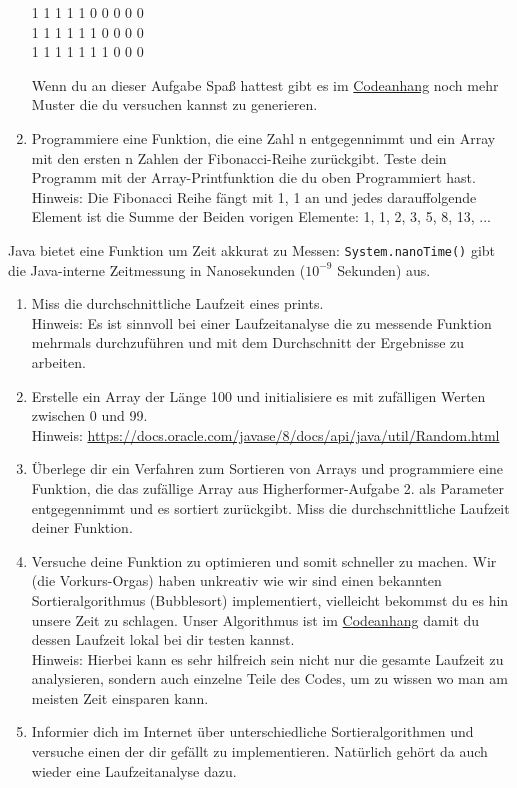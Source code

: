 \documentclass{../../sheet}
\begin{document}
\begin{enumerate}
\begin{ausgabe}
              1 1 1 1 1 0 0 0 0 0 \\
              1 1 1 1 1 1 0 0 0 0 \\
              1 1 1 1 1 1 1 0 0 0
          \end{ausgabe}
          Wenn du an dieser Aufgabe Spaß hattest gibt es im \hyperlink{Aufgabe_4}{Codeanhang} noch mehr Muster die du versuchen kannst zu generieren.
    \item Programmiere eine Funktion, die eine Zahl n entgegennimmt und ein Array mit den ersten n Zahlen der Fibonacci-Reihe zurückgibt. Teste dein Programm mit der Array-Printfunktion die du oben Programmiert hast.\\
          Hinweis: Die Fibonacci Reihe fängt mit 1, 1 an und jedes darauffolgende Element ist die Summe der Beiden vorigen Elemente: 1, 1, 2, 3, 5, 8, 13, ...

\end{enumerate}

\newpage
{}
Java bietet eine Funktion um Zeit akkurat zu Messen: \texttt{System.nanoTime()} gibt die Java-interne Zeitmessung in Nanosekunden ($10^{-9}$ Sekunden) aus.
\begin{enumerate}
    \item Miss die durchschnittliche Laufzeit eines prints.\\
    Hinweis: Es ist sinnvoll bei einer Laufzeitanalyse die zu messende Funktion mehrmals durchzuführen und mit dem Durchschnitt der Ergebnisse zu arbeiten.
    \item Erstelle ein Array der Länge 100 und initialisiere es mit zufälligen Werten zwischen 0 und 99.\\
          Hinweis: \url{https://docs.oracle.com/javase/8/docs/api/java/util/Random.html}
    \item Überlege dir ein Verfahren zum Sortieren von Arrays und programmiere eine Funktion, die das zufällige Array aus Higherformer-Aufgabe 2. als Parameter entgegennimmt und es sortiert zurückgibt. Miss die durchschnittliche Laufzeit deiner Funktion.          
    \item Versuche deine Funktion zu optimieren und somit schneller zu machen. Wir (die Vorkurs-Orgas) haben unkreativ wie wir sind einen bekannten Sortieralgorithmus (Bubblesort) implementiert, vielleicht bekommst du es hin unsere Zeit zu schlagen. Unser Algorithmus ist im \hyperlink{Highperformer}{Codeanhang} damit du dessen Laufzeit lokal bei dir testen kannst.\\
          Hinweis: Hierbei kann es sehr hilfreich sein nicht nur die gesamte Laufzeit zu analysieren, sondern auch einzelne Teile des Codes, um zu wissen wo man am meisten Zeit einsparen kann.
    \item Informier dich im Internet über unterschiedliche Sortieralgorithmen und versuche einen der dir gefällt zu implementieren. Natürlich gehört da auch wieder eine Laufzeitanalyse dazu.
\end{enumerate}
\end{document}
